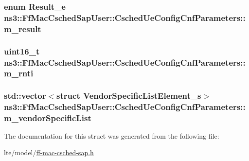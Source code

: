 \subsubsection[{\texorpdfstring{m\+\_\+result}{m_result}}]{\setlength{\rightskip}{0pt plus 5cm}enum {\bf Result\+\_\+e} ns3\+::\+Ff\+Mac\+Csched\+Sap\+User\+::\+Csched\+Ue\+Config\+Cnf\+Parameters\+::m\+\_\+result}\hypertarget{structns3_1_1FfMacCschedSapUser_1_1CschedUeConfigCnfParameters_add8e213a5f2e57ee0b72758e80ec6b7e}{}\label{structns3_1_1FfMacCschedSapUser_1_1CschedUeConfigCnfParameters_add8e213a5f2e57ee0b72758e80ec6b7e}
\subsubsection[{\texorpdfstring{m\+\_\+rnti}{m_rnti}}]{\setlength{\rightskip}{0pt plus 5cm}uint16\+\_\+t ns3\+::\+Ff\+Mac\+Csched\+Sap\+User\+::\+Csched\+Ue\+Config\+Cnf\+Parameters\+::m\+\_\+rnti}\hypertarget{structns3_1_1FfMacCschedSapUser_1_1CschedUeConfigCnfParameters_a8cff26ac831092181fded525a0968d7d}{}\label{structns3_1_1FfMacCschedSapUser_1_1CschedUeConfigCnfParameters_a8cff26ac831092181fded525a0968d7d}
\subsubsection[{\texorpdfstring{m\+\_\+vendor\+Specific\+List}{m_vendorSpecificList}}]{\setlength{\rightskip}{0pt plus 5cm}std\+::vector$<$struct {\bf Vendor\+Specific\+List\+Element\+\_\+s}$>$ ns3\+::\+Ff\+Mac\+Csched\+Sap\+User\+::\+Csched\+Ue\+Config\+Cnf\+Parameters\+::m\+\_\+vendor\+Specific\+List}\hypertarget{structns3_1_1FfMacCschedSapUser_1_1CschedUeConfigCnfParameters_a1fae6955aba8aeb092b2f31bfc8cdfee}{}\label{structns3_1_1FfMacCschedSapUser_1_1CschedUeConfigCnfParameters_a1fae6955aba8aeb092b2f31bfc8cdfee}


The documentation for this struct was generated from the following file\+:\begin{DoxyCompactItemize}
\item 
lte/model/\hyperlink{ff-mac-csched-sap_8h}{ff-\/mac-\/csched-\/sap.\+h}\end{DoxyCompactItemize}
